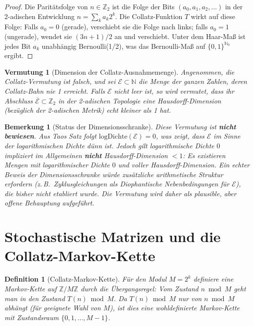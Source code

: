 \documentclass[12pt,a4paper]{article}
\newtheorem{definition}[theorem]{Definition}
\newtheorem{remark}[theorem]{Bemerkung}
\newtheorem{conjecture}[theorem]{Vermutung}
\begin{document}
\begin{proof}
Die Paritätsfolge von $n \in \mathbb{Z}_2$ ist die Folge der Bits $(a_0, a_1, a_2, \ldots)$
in der 2-adischen Entwicklung $n = \sum_k a_k 2^k$. Die Collatz-Funktion $T$ wirkt auf
diese Folge: Falls $a_0 = 0$ (gerade), verschiebt sie die Folge nach links; falls
$a_0 = 1$ (ungerade), wendet sie $(3n+1)/2$ an und verschiebt. Unter dem Haar-Maß ist
jedes Bit $a_k$ unabhängig Bernoulli(1/2), was das Bernoulli-Maß auf $\{0,1\}^{\mathbb{N}_0}$ ergibt.
\end{proof}

\begin{conjecture}[Dimension der Collatz-Ausnahmemenge]\label{conj:dimension}
Angenommen, die Collatz-Vermutung ist falsch, und sei $\mathcal{E} \subset \mathbb{N}$
die Menge der ganzen Zahlen, deren Collatz-Bahn nie 1 erreicht. Falls $\mathcal{E}$
nicht leer ist, so wird vermutet, dass ihr Abschluss $\overline{\mathcal{E}} \subset \mathbb{Z}_2$
in der 2-adischen Topologie eine Hausdorff-Dimension (bezüglich der 2-adischen Metrik)
echt kleiner als 1 hat.
\end{conjecture}

\begin{remark}[Status der Dimensionsschranke]
Diese Vermutung ist \textbf{nicht bewiesen}. Aus Taos Satz folgt $\mathrm{logDichte}(\mathcal{E}) = 0$,
was zeigt, dass $\mathcal{E}$ im Sinne der logarithmischen Dichte dünn ist.
Jedoch gilt \emph{logarithmische Dichte $0$ impliziert im Allgemeinen \textbf{nicht}
Hausdorff-Dimension $< 1$}: Es existieren Mengen mit logarithmischer Dichte $0$ und
voller Hausdorff-Dimension. Ein echter Beweis der Dimensionsschranke würde zusätzliche
arithmetische Struktur erfordern (z.\,B.\ Zyklusgleichungen als Diophantische Nebenbedingungen
für $\mathcal{E}$), die bisher nicht etabliert wurde. Die Vermutung wird daher als
plausible, aber offene Behauptung aufgeführt.
\end{remark}

\section{Stochastische Matrizen und die Collatz-Markov-Kette}

\begin{definition}[Collatz-Markov-Kette]\label{def:markov}
Für den Modul $M = 2^k$ definiere eine Markov-Kette auf $\mathbb{Z}/M\mathbb{Z}$ durch
die Übergangsregel: Vom Zustand $n \bmod M$ geht man in den Zustand $T(n) \bmod M$.
Da $T(n) \bmod M$ nur von $n \bmod M$ abhängt (für geeignete Wahl von $M$), ist dies
eine wohldefinierte Markov-Kette mit Zustandsraum $\{0, 1, \ldots, M-1\}$.
\end{definition}
\end{document}
